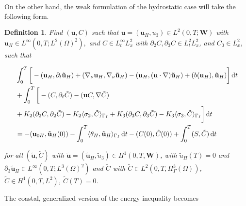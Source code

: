 \documentclass[11pt]{article}
\newtheorem{definition}{Definition}
\newcommand*\diff{\mathop{}\!\mathrm{d}}
\begin{document}
On the other hand, the weak formulation of the hydrostatic case will take the following form.

\begin{definition}
Find $(\mathbf{u}, C)$ such that $\mathbf{u} = (\mathbf{u}_H, u_3) \in L^2 (0, T; \mathbf{W})$ with $\mathbf{u}_H \in L^\infty (0,T; L^2(\Omega)^2),$ and $C \in L_t^\infty L_x^2$ with $\partial_2 C, \partial_3 C \in L^2_t L^2_x$, and $C_0 \in L^2_x$, such that

  \begin{equation}
    \begin{split}
      & \int_0^T \bigg [ -(\mathbf{u}_H, \partial_t \mathbf{\tilde{u}}_H) + (\nabla_\nu \mathbf{u}_H, \nabla_\nu \mathbf{\tilde{u}}_H) - (\mathbf{u}_H, (\mathbf{u} \cdot \nabla) \mathbf{\tilde{u}}_H) + (b(\mathbf{u}_H), \mathbf{\tilde{u}}_H) \bigg ] \diff t \\
      & + \int_0^T \bigg [ -(C, \partial_t \tilde{C}) -(\mathbf{u}C, \nabla \tilde{C}) \\
      & + K_2 (\partial_2 C, \partial_2 \tilde{C}) - K_2 \langle \sigma_2 , \tilde{C} \rangle_{\Gamma_I} + K_3 (\partial_3 C, \partial_3 \tilde{C}) - K_3 \langle\sigma_3 , \tilde{C} \rangle_{\Gamma_I}\bigg ]  \diff t \\
      & = - (\mathbf{u}_{0H}, \mathbf{\tilde{u}}_H(0)) -\int_0^T \langle \theta_H, \mathbf{\tilde{u}}_H \rangle_{\Gamma_I} \diff t - (C(0), \tilde{C}(0)) + \int_0^T (S,\tilde{C}) \diff t \raisetag{20pt} \label{coastalHydrostatic}
    \end{split}
  \end{equation}
  
  for all $(\mathbf{\tilde{u}}, \tilde{C})$ with $\mathbf{\tilde{u}} = (\mathbf{\tilde{u}}_H, \tilde{u}_3) \in H^1 (0,T, \mathbf{W})$, with $\tilde{u}_H (T) = 0$ and $\partial_3 \mathbf{\tilde{u}}_H \in L^\infty (0, T; L^3 (\Omega)^2)$ and $\tilde{C}$ with $\tilde{C} \in L^2 (0,T, H^3_{\Gamma} (\Omega))$, $\tilde{C} \in H^1 (0,T, L^2)$, $\tilde{C} (T) = 0$. 
\end{definition}

The coastal, generalized version of the energy inequality becomes
\end{document}
